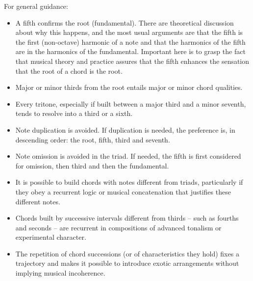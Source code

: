 For general guidance:
\begin{itemize}
        \item A fifth confirms the root (fundamental).
		There are theoretical discussion about why this happens, and the most usual arguments are that the fifth is the first (non-octave) harmonic of a note and that the harmonics of the fifth are in the harmonics of the fundamental.
		Important here is to grasp the fact that musical theory and practice assures that the fifth enhances the sensation that
		the root of a chord is the root.
        \item Major or minor thirds from the root entails major or minor chord qualities.
        \item Every tritone, especially if built between a major third and a minor seventh, tends to resolve into a third or a sixth.
        \item Note duplication is avoided. If duplication is needed, the preference is, in descending order: the root, fifth, third and seventh.
        \item Note omission is avoided in the triad. If needed, the fifth is first considered for omission, then third and then the fundamental.
        \item It is possible to build chords with notes different from triads, particularly if they obey a recurrent logic or musical concatenation that justifies these different notes.
        \item Chords built by successive intervals different from thirds -- such as fourths and seconds -- are recurrent in compositions of advanced tonalism or experimental character.
        \item The repetition of chord successions (or of characteristics they hold) fixes a trajectory and makes it possible to 
introduce exotic arrangements without implying musical incoherence.
\end{itemize}

